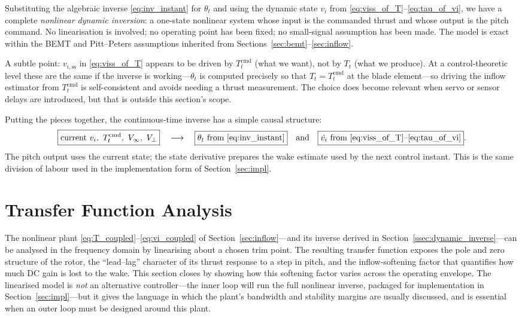 \documentclass[11pt,a4paper]{article}
\newcommand{\Tt}{T_t}
\newcommand{\thetat}{\theta_t}
\newcommand{\vi}{v_i}
\newcommand{\viss}{v_{i,\text{ss}}}
\newcommand{\Tcmd}{T_t^{\text{cmd}}}
\let\oldsection\section
\renewcommand{\section}{\clearpage\oldsection}
\begin{document}
Substituting the algebraic inverse \eqref{eq:inv_instant} for
\(\thetat\) and using the dynamic state \(\vi\) from
\eqref{eq:viss_of_T}--\eqref{eq:tau_of_vi}, we have a complete
\emph{nonlinear dynamic inversion}: a one-state nonlinear system whose
input is the commanded thrust and whose output is the pitch command.
No linearisation is involved; no operating point has been fixed; no
small-signal assumption has been made. The model is exact within the
BEMT and Pitt--Peters assumptions inherited from
Sections~\ref{sec:bemt}--\ref{sec:inflow}.

A subtle point: \(\viss\) in \eqref{eq:viss_of_T} appears to be driven
by \(\Tcmd\) (what we want), not by \(\Tt\) (what we produce). At a
control-theoretic level these are the same if the inverse is
working---\(\thetat\) is computed precisely so that \(\Tt = \Tcmd\) at
the blade element---so driving the inflow estimator from \(\Tcmd\) is
self-consistent and avoids needing a thrust measurement. The choice
does become relevant when servo or sensor delays are introduced, but
that is outside this section's scope.

Putting the pieces together, the continuous-time inverse has a simple
causal structure:
\[
\boxed{\text{current } \vi,\ \Tcmd,\ V_\infty,\ V_\perp}
\quad\longrightarrow\quad
\boxed{\thetat \text{ from } \eqref{eq:inv_instant}}
\quad\text{and}\quad
\boxed{\dot{\vi} \text{ from } \eqref{eq:viss_of_T}\text{--}\eqref{eq:tau_of_vi}}.
\]
The pitch output uses the current state; the state derivative prepares
the wake estimate used by the next control instant. This is the same
division of labour used in the implementation form of
Section~\ref{sec:impl}.

\section{Transfer Function Analysis}\label{sec:linear}

The nonlinear plant \eqref{eq:T_coupled}--\eqref{eq:vi_coupled} of
Section~\ref{sec:inflow}---and its inverse derived in
Section~\ref{ssec:dynamic_inverse}---can be analysed in the frequency
domain by linearising about a chosen trim point. The resulting
transfer function exposes the pole and zero structure of the rotor,
the ``lead--lag'' character of its thrust response to a step in
pitch, and the inflow-softening factor that quantifies how much DC
gain is lost to the wake. This section closes by showing how this
softening factor varies across the operating envelope. The
linearised model is \emph{not} an alternative controller---the inner
loop will run the full nonlinear inverse, packaged for implementation
in Section~\ref{sec:impl}---but it gives the language in which the
plant's bandwidth and stability margins are usually discussed, and
is essential when an outer loop must be designed around this plant.
\end{document}
